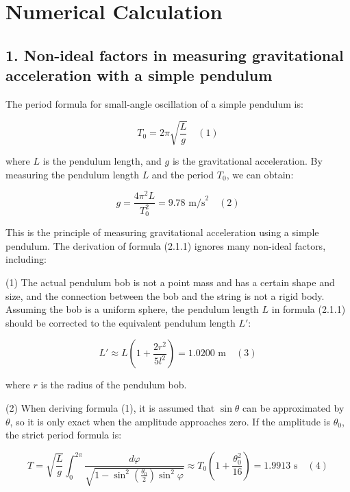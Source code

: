 \documentclass{report}
\begin{document}
\section*{Numerical Calculation}

\subsection*{1. Non-ideal factors in measuring gravitational acceleration with a simple pendulum}

The period formula for small-angle oscillation of a simple pendulum is:

\begin{equation}
    T_0 = 2\pi \sqrt{\frac{L}{g}} \quad (1)
\end{equation}

where \(L\) is the pendulum length, and \(g\) is the gravitational acceleration. By measuring the pendulum length \(L\) and the period \(T_0\), we can obtain:

\begin{equation}
    g = \frac{4\pi^2 L}{T_0^2} = 9.78 \text{ m/s}^2 \quad (2)
\end{equation}

This is the principle of measuring gravitational acceleration using a simple pendulum. The derivation of formula (2.1.1) ignores many non-ideal factors, including:

(1) The actual pendulum bob is not a point mass and has a certain shape and size, and the connection between the bob and the string is not a rigid body. Assuming the bob is a uniform sphere, the pendulum length \(L\) in formula (2.1.1) should be corrected to the equivalent pendulum length \(L'\):

\begin{equation}
    L' \approx L \left( 1 + \frac{2r^2}{5l^2} \right) = 1.0200 \text{ m} \quad (3)
\end{equation}

where \(r\) is the radius of the pendulum bob.

(2) When deriving formula (1), it is assumed that \(\sin \theta\) can be approximated by \(\theta\), so it is only exact when the amplitude approaches zero. If the amplitude is \(\theta_0\), the strict period formula is:

\begin{equation}
    T = \sqrt{\frac{L}{g}} \int_0^{2\pi} \frac{d\varphi}{\sqrt{1 - \sin^2(\frac{\theta_0}{2}) \sin^2 \varphi}} \approx T_0 \left( 1 + \frac{\theta_0^2}{16} \right) = 1.9913 \text{ s} \quad (4)
\end{equation}
\end{document}

